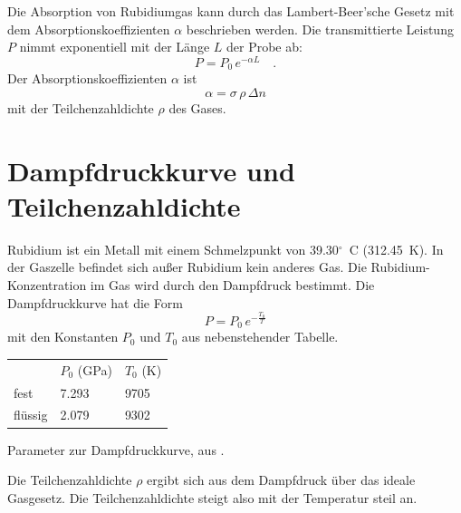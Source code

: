 Die Absorption von Rubidiumgas kann durch das Lambert-Beer'sche Gesetz mit dem Absorptionskoeffizienten $\alpha$ beschrieben werden. Die transmittierte Leistung $P$ nimmt exponentiell mit der Länge $L$ der Probe ab:
\begin{equation}
	P = P_0  \, e^{- \alpha L} \quad . \label{eq:lambert_beer}
\end{equation}
Der Absorptionskoeffizienten $\alpha$ ist
\begin{equation}
	\alpha = \sigma  \, \rho  \, \Delta n
\end{equation}
mit der Teilchenzahldichte $\rho$ des Gases.


\begin{questions}
\end{questions}


\section{Dampfdruckkurve und Teilchenzahldichte}

Rubidium ist ein Metall mit einem Schmelzpunkt von 39.30$^\circ$~C (312.45~K). In der Gaszelle befindet sich außer Rubidium kein anderes Gas. Die Rubidium-Konzentration im Gas wird durch den Dampfdruck bestimmt. Die Dampfdruckkurve hat die Form
\begin{equation}
    P = P_0 \, e^{- \frac{T_0}{T}}
\end{equation}
mit den Konstanten $P_0$ und $T_0$ aus nebenstehender Tabelle. 

\begin{margintable}
    \begin{tabular}{lll}
           & $P_0$ (GPa) & $T_0$ (K) \\
           fest  &  7.293   & 9705 \\
           flüssig  &  2.079  & 9302 \\
    \end{tabular}
	\caption{Parameter zur Dampfdruckkurve, aus \cite{Data85}.}
\end{margintable}



Die Teilchenzahldichte $\rho$ ergibt sich aus dem Dampfdruck über das ideale Gasgesetz. Die Teilchenzahldichte steigt also mit der Temperatur steil an.


